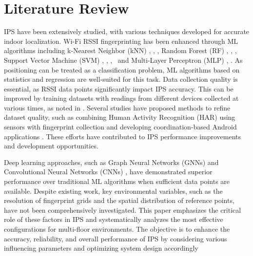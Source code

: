 \documentclass[runningheads]{llncs}
\begin{document}
\section{Literature Review}
IPS have been extensively studied, with various techniques developed for accurate indoor localization. Wi-Fi RSSI fingerprinting has been enhanced through ML algorithms including k-Nearest Neighbor (kNN) \cite{LRE1}, \cite{LRE2}, \cite{LRE6}, Random Forest (RF) \cite{LRE1}, \cite{LRE6}, \cite{LRE5}, Support Vector Machine (SVM) \cite{LRE1}, \cite{LRE2}, \cite{LRE6},~\cite{add1} and Multi-Layer Perceptron (MLP) \cite{LRE1}, \cite{LRE2}. As positioning can be treated as a classification problem, ML algorithms based on statistics and regression are well-suited for this task. Data collection quality is essential, as RSSI data points significantly impact IPS accuracy. This can be improved by training datasets with readings from different devices collected at various times, as noted in \cite{LRE3}. Several studies have proposed methods to refine dataset quality, such as combining Human Activity Recognition (HAR) using sensors with fingerprint collection \cite{LRE4} and developing coordination-based Android applications \cite{LRE7}. These efforts have contributed to IPS performance improvements and development opportunities. 

Deep learning approaches, such as Graph Neural Networks (GNNs) \cite{LRE2} and Convolutional Neural Networks (CNNs) \cite{LRE4}, have demonstrated superior performance over traditional ML algorithms when sufficient data points are available. Despite existing work, key environmental variables, such as the resolution of fingerprint grids and the spatial distribution of reference points, have not been comprehensively investigated. This paper emphasizes the critical role of these factors in IPS and systematically analyzes the most effective configurations for multi-floor environments. The objective is to enhance the accuracy, reliability, and overall performance of IPS by considering various influencing parameters and optimizing system design accordingly

\end{document}
